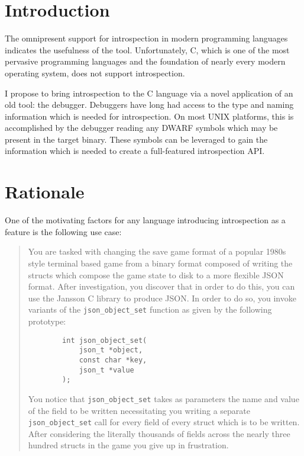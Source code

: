 \documentclass[draft]{article}
\begin{document}
{}

\section{Introduction}
The omnipresent support for introspection in modern programming languages
indicates the usefulness of the tool. \autocite{java-reflect, ruby-introspect,
python-introspect, perl-introspect} Unfortunately, C, which is one of the most
pervasive programming languages and the foundation of nearly every modern
operating system, does not support introspection.

I propose to bring introspection to the C language via a novel application of an
old tool: the debugger. Debuggers have long had access to the type and naming
information which is needed for introspection. On most UNIX platforms, this is
accomplished by the debugger reading any DWARF \autocite{dwarf} symbols which may
be present in the target binary. These symbols can be leveraged to gain the
information which is needed to create a full-featured introspection API.

\section{Rationale}
One of the motivating factors for any language introducing introspection as a
feature is the following use case:

\begin{quotation}
	You are tasked with changing the save game format of a popular 1980s style
	terminal based game from a binary format composed of writing the structs
	which compose the game state to disk to a more flexible JSON format. After
	investigation, you discover that in order to do this, you can use the
	Jansson \autocite{jansson} C library to produce JSON. In order to do so, you
	invoke variants of the \texttt{json\_object\_set} function as given by the
	following prototype:
	\begin{verbatim}
		int json_object_set(
			json_t *object,
			const char *key,
			json_t *value
		);
	\end{verbatim}
	You notice that \texttt{json\_object\_set} takes as parameters the name and
	value of the field to be written necessitating you writing a separate
	\texttt{json\_object\_set} call for every field of every struct which is to
	be written. After considering the literally thousands of fields across the
	nearly three hundred structs in the game you give up in frustration.
\end{quotation}
\end{document}
